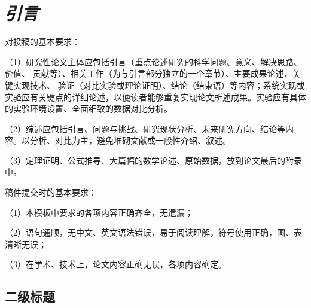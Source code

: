 \documentclass{cjc}
\begin{document}
\newcommand{\sect}[1]{\section{\textbf\emph{#1}}}
\newcommand{\ssect}[1]{\subsection{\textbf\emph{#1}}}
\newcommand{\sssect}[1]{\subsubsection{\textbf\emph{#1}}}



\maketitle


\sect{引言}

对投稿的基本要求：

（1）研究性论文主体应包括引言（重点论述研究的科学问题、意义、解决思路、价值、
贡献等）、相关工作（为与引言部分独立的一个章节）、主要成果论述、关键实现技术、
验证（对比实验或理论证明）、结论（结束语）等内容；系统实现或实验应有关键点的详细论述，以便读者能够重复实现论文所述成果。实验应有具体的实验环境设置、全面细致的数据对比分析。

（2）综述应包括引言、问题与挑战、研究现状分析、未来研究方向、结论等内容。以分析、对比为主，避免堆砌文献或一般性介绍、叙述。

（3）定理证明、公式推导、大篇幅的数学论述、原始数据，放到论文最后的附录中。

稿件提交时的基本要求：

（1）本模板中要求的各项内容正确齐全，无遗漏；

（2）语句通顺，无中文、英文语法错误，易于阅读理解，符号使用正确，图、表清晰无误；

（3）在学术、技术上，论文内容正确无误，各项内容确定。

\subsection{\textbf{二级标题}}
\end{document}
